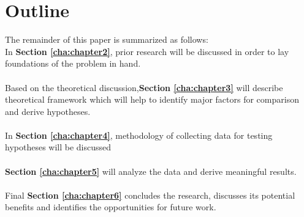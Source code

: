\section{Outline\label{sec:outline}}

The remainder of this paper is summarized as follows:
\\
In \textbf{Section \ref{cha:chapter2}}, prior research will be discussed
in order to lay foundations of the problem in hand.
\\
\\
Based on the theoretical discussion,\textbf{Section \ref{cha:chapter3}} will describe theoretical framework which will help to identify major factors for comparison and derive hypotheses. 
\\
\\
In \textbf{Section \ref{cha:chapter4}}, methodology of collecting data for testing hypotheses will be
discussed
\\
\\
\textbf{Section \ref{cha:chapter5}} will analyze the data and derive meaningful results.
\\
\\
Final \textbf{Section \ref{cha:chapter6}} concludes the research, discusses its potential benefits and identifies the opportunities for future
work.

